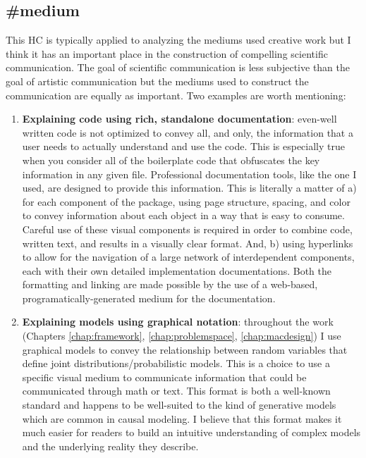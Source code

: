 \documentclass[./main.tex]{subfiles}
\begin{document}

\subsection*{\textbf{\#medium}}
\label{hc:medium}

This HC is typically applied to analyzing the mediums used creative work but I think it has an important place in the construction of compelling scientific communication. The goal of scientific communication is less subjective than the goal of artistic communication but the mediums used to construct the communication are equally as important. Two examples are worth mentioning:

\begin{enumerate}
    \item \textbf{Explaining code using rich, standalone documentation}: even-well written code is not optimized to convey all, and only, the information that a user needs to actually understand and use the code. This is especially true when you consider all of the boilerplate code that obfuscates the key information in any given file. Professional documentation tools, like the one I used, are designed to provide this information. This is literally a matter of a) for each component of the package, using page structure, spacing, and color to convey information about each object in a way that is easy to consume. Careful use of these visual components is required in order to combine code, written text, and results in a visually clear format. And, b) using hyperlinks to allow for the navigation of a large network of interdependent components, each with their own detailed implementation documentations. Both the formatting and linking are made possible by the use of a web-based, programatically-generated medium for the documentation.
    
    \item \textbf{Explaining models using graphical notation}: throughout the work (Chapters \ref{chap:framework}, \ref{chap:problemspace}, \ref{chap:macdesign}) I use graphical models to convey the relationship between random variables that define joint distributions/probabilistic models. This is a choice to use a specific visual medium to communicate information that could be communicated through math or text. This format is both a well-known standard and happens to be well-suited to the kind of generative models which are common in causal modeling. I believe that this format makes it much easier for readers to build an intuitive understanding of complex models and the underlying reality they describe.
\end{enumerate}
\end{document}
